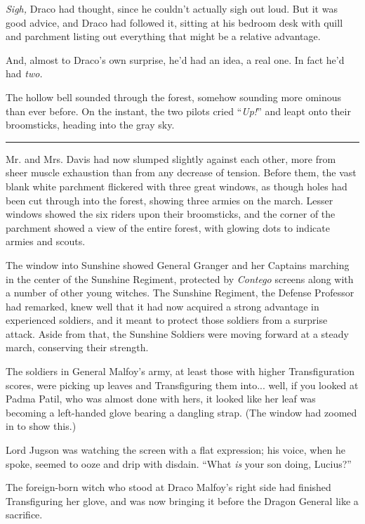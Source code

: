 \emph{Sigh,} Draco had thought, since he couldn't actually sigh out loud. But it was good advice, and Draco had followed it, sitting at his bedroom desk with quill and parchment listing out everything that might be a relative advantage.

And, almost to Draco's own surprise, he'd had an idea, a real one. In fact he'd had \emph{two.}

The hollow bell sounded through the forest, somehow sounding more ominous than ever before. On the instant, the two pilots cried ``\emph{Up!}'' and leapt onto their broomsticks, heading into the gray sky.

\begin{center}\rule{3in}{0.4pt}\end{center}

Mr. and Mrs. Davis had now slumped slightly against each other, more from sheer muscle exhaustion than from any decrease of tension. Before them, the vast blank white parchment flickered with three great windows, as though holes had been cut through into the forest, showing three armies on the march. Lesser windows showed the six riders upon their broomsticks, and the corner of the parchment showed a view of the entire forest, with glowing dots to indicate armies and scouts.

The window into Sunshine showed General Granger and her Captains marching in the center of the Sunshine Regiment, protected by \emph{Contego} screens along with a number of other young witches. The Sunshine Regiment, the Defense Professor had remarked, knew well that it had now acquired a strong advantage in experienced soldiers, and it meant to protect those soldiers from a surprise attack. Aside from that, the Sunshine Soldiers were moving forward at a steady march, conserving their strength.

The soldiers in General Malfoy's army, at least those with higher Transfiguration scores, were picking up leaves and Transfiguring them into... well, if you looked at Padma Patil, who was almost done with hers, it looked like her leaf was becoming a left-handed glove bearing a dangling strap. (The window had zoomed in to show this.)

Lord Jugson was watching the screen with a flat expression; his voice, when he spoke, seemed to ooze and drip with disdain. ``What \emph{is} your son doing, Lucius?''

The foreign-born witch who stood at Draco Malfoy's right side had finished Transfiguring her glove, and was now bringing it before the Dragon General like a sacrifice.

